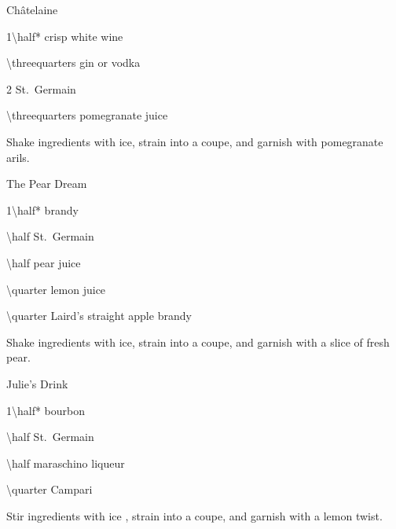 \begin{Cocktail}{Ch\^atelaine}
	\begin{Ingredients}
	\item \SI{1\half*}{\oz} crisp white wine
	\item \SI{\threequarters}{\oz} gin or vodka
	\item \SI{2}{\tsp} St.\ Germain
	\item \SI{\threequarters}{\oz} pomegranate juice
	\end{Ingredients}
	
	\begin{Instructions}
	Shake ingredients with ice, strain into a coupe, and garnish with pomegranate arils.
	\end{Instructions}
\end{Cocktail}

\begin{Cocktail*}{The Pear Dream} %
	\begin{Ingredients}
	\item \SI{1\half*}{\oz} brandy%
	\item \SI{\half}{\oz} St.\ Germain
	\item \SI{\half}{\oz} pear juice
	\item \SI{\quarter}{\oz} lemon juice
	\item \SI{\quarter}{\oz} Laird's straight apple brandy
	\end{Ingredients}
	
	\begin{Instructions}
	Shake ingredients with ice, strain into a coupe, and garnish with a slice of fresh pear.
	\end{Instructions}
\end{Cocktail*}

\begin{Cocktail*}{Julie's Drink} %
	\begin{Ingredients}
	\item \SI{1\half*}{\oz} bourbon
	\item \SI{\half}{\oz} St.\ Germain
	\item \SI{\half}{\oz} maraschino liqueur%
	\item \SI{\quarter}{\oz} Campari
	\end{Ingredients}
	
	\begin{Instructions}
	Stir ingredients with ice%
	, strain into a coupe, and garnish with a lemon twist.
	\end{Instructions}
\end{Cocktail*}

